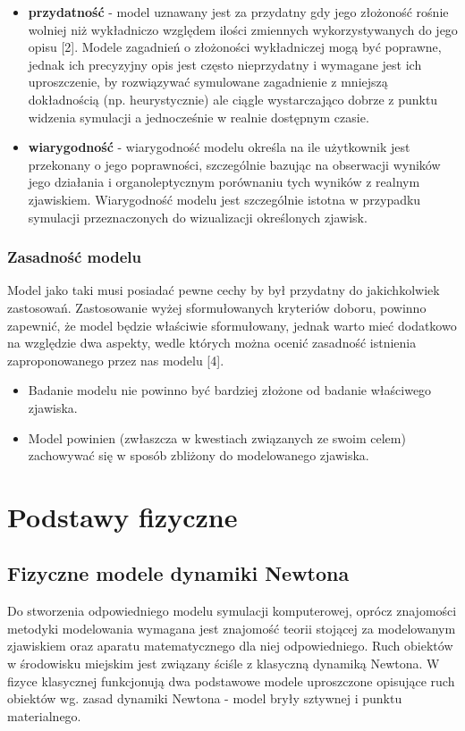 {\begin{itemize}
{\begin{center}
\textit{Popraność modelu względem modelowanego zjawiska [2].}
\end{center}
}
\item \textbf{przydatność} - model uznawany jest za przydatny gdy jego złożoność rośnie wolniej niż wykładniczo względem ilości zmiennych wykorzystywanych do jego opisu [2]. Modele zagadnień o złożoności wykładniczej mogą być poprawne, jednak ich precyzyjny opis jest często nieprzydatny i wymagane jest ich uproszczenie, by rozwiązywać symulowane zagadnienie z mniejszą dokładnością (np. heurystycznie) ale ciągle wystarczająco dobrze z punktu widzenia symulacji a jednocześnie w realnie dostępnym czasie.
\item \textbf{wiarygodność} - wiarygodność modelu określa na ile użytkownik jest przekonany o jego poprawności, szczególnie bazując na obserwacji wyników jego działania i organoleptycznym porównaniu tych wyników z realnym zjawiskiem. Wiarygodność modelu jest szczególnie istotna w przypadku symulacji przeznaczonych do wizualizacji określonych zjawisk.
\end{itemize}
}

\subsubsection{Zasadność modelu}
\par{
Model jako taki musi posiadać pewne cechy by był przydatny do jakichkolwiek zastosowań. Zastosowanie wyżej sformułowanych kryteriów doboru, powinno zapewnić, że model będzie właściwie sformułowany, jednak warto mieć dodatkowo na względzie dwa aspekty, wedle których można ocenić zasadność istnienia zaproponowanego przez nas modelu [4].
\begin{itemize}
\item Badanie modelu nie powinno być bardziej złożone od badanie właściwego zjawiska.
\item Model powinien (zwłaszcza w kwestiach związanych ze swoim celem) zachowywać się w sposób zbliżony do modelowanego zjawiska.
\end{itemize}
}


\section[Podstawy fizyczne][Podstawy fizyczne]{Podstawy fizyczne}

\subsection{Fizyczne modele dynamiki Newtona}
\par{
Do stworzenia odpowiedniego modelu symulacji komputerowej, oprócz znajomości metodyki modelowania wymagana jest znajomość teorii stojącej za modelowanym zjawiskiem oraz aparatu matematycznego dla niej odpowiedniego.
Ruch obiektów w środowisku miejskim jest związany ściśle z klasyczną dynamiką Newtona. W fizyce klasycznej funkcjonują dwa podstawowe modele uproszczone opisujące ruch obiektów wg. zasad dynamiki Newtona - model bryły sztywnej i punktu materialnego.
}

